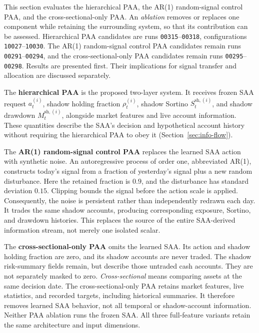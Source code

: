 This section evaluates the hierarchical PAA, the AR(1) random-signal control PAA, and the cross-sectional-only PAA. An \emph{ablation} removes or replaces one component while retaining the surrounding system, so that its contribution can be assessed. Hierarchical PAA candidates are runs \texttt{00315}--\texttt{00318}, configurations \texttt{10027}--\texttt{10030}. The AR(1) random-signal control PAA candidates remain runs \texttt{00291}--\texttt{00294}, and the cross-sectional-only PAA candidates remain runs \texttt{00295}--\texttt{00298}. Results are presented first. Their implications for signal transfer and allocation are discussed separately.

The \textbf{hierarchical PAA} is the proposed two-layer system. It receives frozen SAA request \(a_t^{(i)}\), shadow holding fraction \(\rho_t^{(i)}\), shadow Sortino \(S_t^{\mathrm{sh},(i)}\), and shadow drawdown \(M_t^{\mathrm{sh},(i)}\), alongside market features and live account information. These quantities describe the SAA's decision and hypothetical account history without requiring the hierarchical PAA to obey it (Section~\ref{sec:info-flow}).

The \textbf{AR(1) random-signal control PAA} replaces the learned SAA action with synthetic noise. An autoregressive process of order one, abbreviated AR(1), constructs today's signal from a fraction of yesterday's signal plus a new random disturbance. Here the retained fraction is \(0.9\), and the disturbance has standard deviation \(0.15\). Clipping bounds the signal before the action scale is applied. Consequently, the noise is persistent rather than independently redrawn each day. It trades the same shadow accounts, producing corresponding exposure, Sortino, and drawdown histories. This replaces the source of the entire SAA-derived information stream, not merely one isolated scalar.

The \textbf{cross-sectional-only PAA} omits the learned SAA. Its action and shadow holding fraction are zero, and its shadow accounts are never traded. The shadow risk-summary fields remain, but describe those untraded cash accounts. They are not separately masked to zero. \emph{Cross-sectional} means comparing assets at the same decision date. The cross-sectional-only PAA retains market features, live statistics, and recorded targets, including historical summaries. It therefore removes learned SAA behavior, not all temporal or shadow-account information. Neither PAA ablation runs the frozen SAA. All three full-feature variants retain the same architecture and input dimensions.

